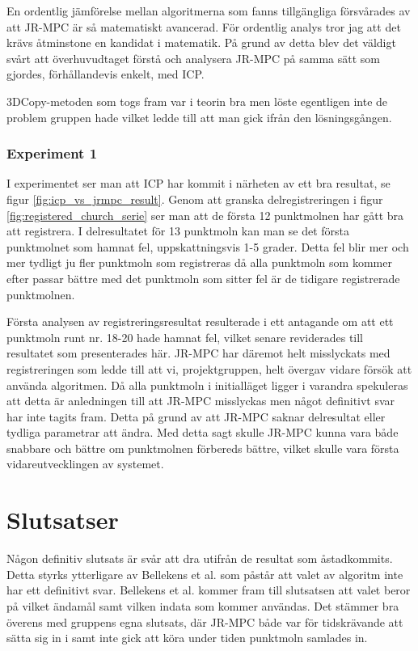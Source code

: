 En ordentlig jämförelse mellan algoritmerna som fanns tillgängliga försvårades av att JR-MPC är så matematiskt avancerad. För ordentlig analys tror jag att det krävs åtminstone en kandidat i matematik. På grund av detta blev det väldigt svårt att överhuvudtaget förstå och analysera JR-MPC på samma sätt som gjordes, förhållandevis enkelt, med ICP. 

3DCopy-metoden som togs fram var i teorin bra men löste egentligen inte de problem gruppen hade vilket ledde till att man gick ifrån den lösningsgången. 

\subsubsection{Experiment 1}

I experimentet ser man att ICP har kommit i närheten av ett bra resultat, se figur \ref{fig:icp_vs_jrmpc_result}. Genom att granska delregistreringen i figur \ref{fig:registered_church_serie} ser man att de första 12 punktmolnen har gått bra att registrera. I delresultatet för 13 punktmoln kan man se det första punktmolnet som hamnat fel, uppskattningsvis 1-5 grader. Detta fel blir mer och mer tydligt ju fler punktmoln som registreras då alla punktmoln som kommer efter passar bättre med det punktmoln som sitter fel är de tidigare registrerade punktmolnen. 

Första analysen av registreringsresultat resulterade i ett antagande om att ett punktmoln runt nr. 18-20 hade hamnat fel, vilket senare reviderades till resultatet som presenterades här. JR-MPC har däremot helt misslyckats med registreringen som ledde till att vi, projektgruppen, helt övergav vidare försök att använda algoritmen. Då alla punktmoln i initialläget ligger i varandra spekuleras att detta är anledningen till att JR-MPC misslyckas men något definitivt svar har inte tagits fram. Detta på grund av att JR-MPC saknar delresultat eller tydliga parametrar att ändra. Med detta sagt skulle JR-MPC kunna vara både snabbare och bättre om punktmolnen förbereds bättre, vilket skulle vara första vidareutvecklingen av systemet.

\section{Slutsatser}
\label{sec:conclusions-karlsson}

Någon definitiv slutsats är svår att dra utifrån de resultat som åstadkommits. Detta styrks ytterligare av Bellekens et al. \cite{registration_comparing} som påstår att valet av algoritm inte har ett definitivt svar. Bellekens et al. kommer fram till slutsatsen att valet beror på vilket ändamål samt vilken indata som kommer användas. Det stämmer bra överens med gruppens egna slutsats, där JR-MPC både var för tidskrävande att sätta sig in i samt inte gick att köra under tiden punktmoln samlades in.

